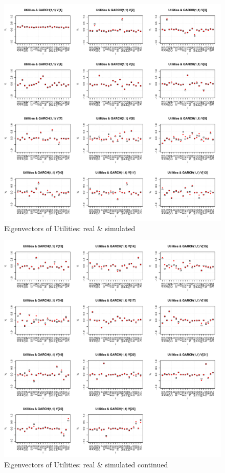 \documentclass{article}
\begin{document}
\begin{figure}[htb!]
  \centering
  \includegraphics[scale=0.5]{Utilities_eigenvectors1.pdf}
  \caption{Eigenvectors of Utilities: real \& simulated}
  \label{fig:Utilities_eigenvectors1}
\end{figure}

\begin{figure}[htb!]
  \centering
  \includegraphics[scale=0.5]{Utilities_eigenvectors2.pdf}
  \caption{Eigenvectors of Utilities: real \& simulated continued}
  \label{fig:Utilities_eigenvectors2}
\end{figure}
\end{document}
